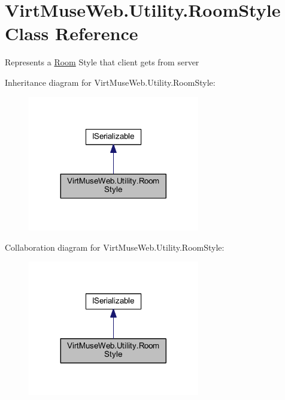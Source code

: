 \hypertarget{class_virt_muse_web_1_1_utility_1_1_room_style}{}\section{Virt\+Muse\+Web.\+Utility.\+Room\+Style Class Reference}
\label{class_virt_muse_web_1_1_utility_1_1_room_style}


Represents a \mbox{\hyperlink{class_room}{Room}} Style that client gets from server  




Inheritance diagram for Virt\+Muse\+Web.\+Utility.\+Room\+Style\+:
\nopagebreak
\begin{figure}[H]
\begin{center}
\leavevmode
\includegraphics[width=212pt]{class_virt_muse_web_1_1_utility_1_1_room_style__inherit__graph}
\end{center}
\end{figure}


Collaboration diagram for Virt\+Muse\+Web.\+Utility.\+Room\+Style\+:
\nopagebreak
\begin{figure}[H]
\begin{center}
\leavevmode
\includegraphics[width=212pt]{class_virt_muse_web_1_1_utility_1_1_room_style__coll__graph}
\end{center}
\end{figure}
